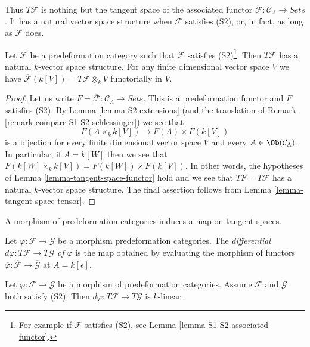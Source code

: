 \noindent
Thus $T \mathcal{F}$ is nothing but the tangent space of the associated
functor $\overline{\mathcal{F}}: \mathcal{C}_\Lambda \to \textit{Sets}$.
It has a natural vector space structure when $\mathcal{F}$ satisfies (S2),
or, in fact, as long as $\overline{\mathcal{F}}$ does.

\begin{lemma}
\label{lemma-tangent-space-vector-space}
Let $\mathcal{F}$ be a predeformation category such that
$\overline{\mathcal{F}}$ satisfies (S2)\footnote{For example
if $\mathcal{F}$ satisfies (S2), see
Lemma \ref{lemma-S1-S2-associated-functor}.}. Then $T \mathcal{F}$ has a
natural $k$-vector space structure. For any finite dimensional
vector space $V$ we have
$\overline{\mathcal{F}}(k[V]) = T\mathcal{F} \otimes_k V$
functorially in $V$.
\end{lemma}

\begin{proof}
Let us write
$F = \overline{\mathcal{F}} : \mathcal{C}_\Lambda \to \textit{Sets}$.
This is a predeformation functor and $F$ satisfies (S2). By
Lemma \ref{lemma-S2-extensions}
(and the translation of
Remark \ref{remark-compare-S1-S2-schlessinger})
we see that
$$
F(A \times_k k[V]) \longrightarrow F(A) \times F(k[V])
$$
is a bijection for every finite dimensional vector space $V$ and every
$A \in \Ob(\mathcal{C}_\Lambda)$. In particular, if $A = k[W]$
then we see that $F(k[W] \times_k k[V]) = F(k[W]) \times F(k[V])$.
In other words, the hypotheses of
Lemma \ref{lemma-tangent-space-functor}
hold and we see that $TF = T \mathcal{F}$
has a natural $k$-vector space structure.
The final assertion follows from
Lemma \ref{lemma-tangent-space-tensor}.
\end{proof}

\noindent
A morphism of predeformation categories induces a map on tangent spaces.

\begin{definition}
\label{definition-differential}
Let $\varphi : \mathcal{F} \to \mathcal{G}$ be a morphism predeformation
categories. The
{\it differential $d \varphi : T \mathcal{F} \to T \mathcal{G}$ of $\varphi$}
is the map obtained by evaluating the morphism of functors
$\overline{\varphi}: \overline{\mathcal{F}} \to \overline{\mathcal{G}}$
at $A = k[\epsilon]$.
\end{definition}

\begin{lemma}
\label{lemma-k-linear-differential}
Let $\varphi : \mathcal{F} \to \mathcal{G}$ be a morphism of predeformation
categories. Assume $\overline{\mathcal{F}}$ and $\overline{\mathcal{G}}$ both
satisfy (S2). Then $d \varphi : T \mathcal{F} \to T \mathcal{G}$ is $k$-linear.
\end{lemma}

